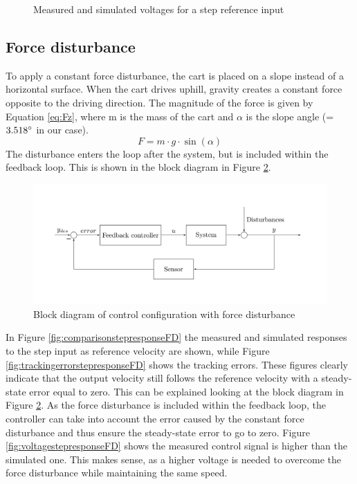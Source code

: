 \documentclass[a4paper,kul]{kulakarticle} %
\begin{document}
\begin{figure}[htp!]
\begin{subfigure}[b]{0.49\textwidth}
	\end{subfigure}
	\caption{Measured and simulated voltages for a step reference input}
	\label{fig:voltagestepresponse}
\end{figure}
\newpage
\subsection{Force disturbance}
To apply a constant force disturbance, the cart is placed on a slope instead of a horizontal surface. When the cart drives uphill, gravity creates a constant force opposite to the driving direction. The magnitude of the force is given by Equation \ref{eq:Fz}, where m is the mass of the cart and $\alpha$ is the slope angle (= $3.518\degree$ in our case). 
\begin{equation}
	\label{eq:Fz}
	F = m\cdot g\cdot \sin(\alpha)
\end{equation}
The disturbance enters the loop after the system, but is included within the feedback loop. This is shown in the block diagram in Figure \ref{fig: blockdiagram}.
\begin{figure}[htp!]
	\centering
	\includegraphics[width=\linewidth]{blockdiagram.png}
	\caption{Block diagram of control configuration with force disturbance \cite{tikz}}
	\label{fig: blockdiagram}
\end{figure}

In Figure \ref{fig:comparisonstepresponseFD} the measured and simulated responses to the step input as reference velocity are shown, while Figure \ref{fig:trackingerrorstepresponseFD} shows the tracking errors. These figures clearly indicate that the output velocity still follows the reference velocity with a steady-state error equal to zero. This can be explained looking at the block diagram in Figure \ref{fig: blockdiagram}. As the force disturbance is included within the feedback loop, the controller can take into account the error caused by the constant force disturbance and thus ensure the steady-state error to go to zero. Figure \ref{fig:voltagestepresponseFD} shows the measured control signal is higher than the simulated one. This makes sense, as a higher voltage is needed to overcome the force disturbance while maintaining the same speed. 
\end{document}
